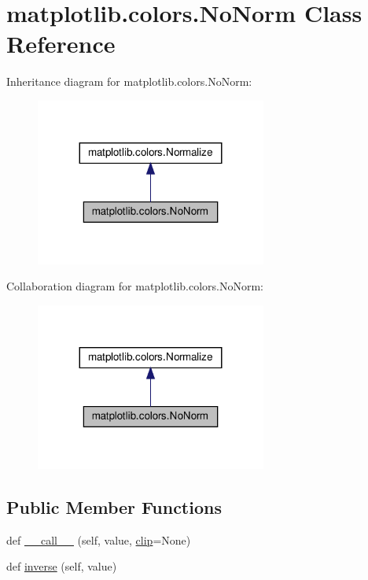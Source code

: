 \hypertarget{classmatplotlib_1_1colors_1_1NoNorm}{}\section{matplotlib.\+colors.\+No\+Norm Class Reference}
\label{classmatplotlib_1_1colors_1_1NoNorm}


Inheritance diagram for matplotlib.\+colors.\+No\+Norm\+:
\nopagebreak
\begin{figure}[H]
\begin{center}
\leavevmode
\includegraphics[width=215pt]{classmatplotlib_1_1colors_1_1NoNorm__inherit__graph}
\end{center}
\end{figure}


Collaboration diagram for matplotlib.\+colors.\+No\+Norm\+:
\nopagebreak
\begin{figure}[H]
\begin{center}
\leavevmode
\includegraphics[width=215pt]{classmatplotlib_1_1colors_1_1NoNorm__coll__graph}
\end{center}
\end{figure}
\subsection*{Public Member Functions}
\begin{DoxyCompactItemize}
\item 
def \hyperlink{classmatplotlib_1_1colors_1_1NoNorm_ac8772102fca48f3b0f1a22ae4e532114}{\+\_\+\+\_\+call\+\_\+\+\_\+} (self, value, \hyperlink{classmatplotlib_1_1colors_1_1Normalize_a7355c143b0fcdd0ec9998c02e2962a8b}{clip}=None)
\item 
def \hyperlink{classmatplotlib_1_1colors_1_1NoNorm_a2135d15daa15746706005eb8c14813e3}{inverse} (self, value)
\end{DoxyCompactItemize}
